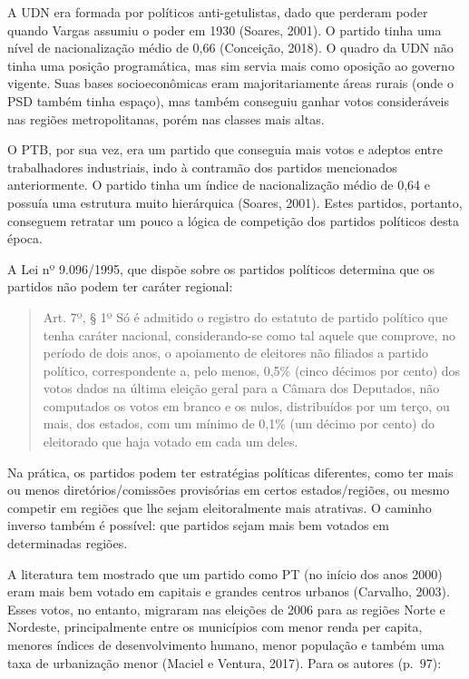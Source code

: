\documentclass[]{article}
\begin{document}
A UDN era formada por políticos anti-getulistas, dado que perderam poder
quando Vargas assumiu o poder em 1930 (Soares, 2001). O partido tinha
uma nível de nacionalização médio de 0,66 (Conceição, 2018). O quadro da
UDN não tinha uma posição programática, mas sim servia mais como
oposição ao governo vigente. Suas bases socioeconômicas eram
majoritariamente áreas rurais (onde o PSD também tinha espaço), mas
também conseguiu ganhar votos consideráveis nas regiões metropolitanas,
porém nas classes mais altas.

O PTB, por sua vez, era um partido que conseguia mais votos e adeptos
entre trabalhadores industriais, indo à contramão dos partidos
mencionados anteriormente. O partido tinha um índice de nacionalização
médio de 0,64 e possuía uma estrutura muito hierárquica (Soares, 2001).
Estes partidos, portanto, conseguem retratar um pouco a lógica de
competição dos partidos políticos desta época.

A Lei nº 9.096/1995, que dispõe sobre os partidos políticos determina
que os partidos não podem ter caráter regional:

\begin{quote}
Art. 7º, § 1º Só é admitido o registro do estatuto de partido político
que tenha caráter nacional, considerando-se como tal aquele que
comprove, no período de dois anos, o apoiamento de eleitores não
filiados a partido político, correspondente a, pelo menos, 0,5\% (cinco
décimos por cento) dos votos dados na última eleição geral para a Câmara
dos Deputados, não computados os votos em branco e os nulos,
distribuídos por um terço, ou mais, dos estados, com um mínimo de 0,1\%
(um décimo por cento) do eleitorado que haja votado em cada um deles.
\end{quote}

Na prática, os partidos podem ter estratégias políticas diferentes, como
ter mais ou menos diretórios/comissões provisórias em certos
estados/regiões, ou mesmo competir em regiões que lhe sejam
eleitoralmente mais atrativas. O caminho inverso também é possível: que
partidos sejam mais bem votados em determinadas regiões.

A literatura tem mostrado que um partido como PT (no início dos anos
2000) eram mais bem votado em capitais e grandes centros urbanos
(Carvalho, 2003). Esses votos, no entanto, migraram nas eleições de 2006
para as regiões Norte e Nordeste, principalmente entre os municípios com
menor renda per capita, menores índices de desenvolvimento humano, menor
população e também uma taxa de urbanização menor (Maciel e Ventura,
2017). Para os autores (p.~97):
\end{document}
